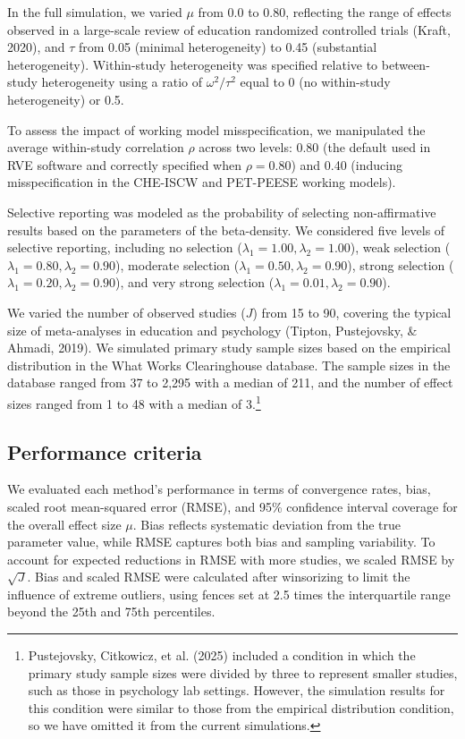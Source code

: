 \documentclass[
  man, donotrepeattitle,floatsintext]{apa7}
\begin{document}
In the full simulation, we varied \(\mu\) from 0.0 to 0.80, reflecting the range of effects observed in a large-scale review of education randomized controlled trials (Kraft, 2020), and \(\tau\) from 0.05 (minimal heterogeneity) to 0.45 (substantial heterogeneity). Within-study heterogeneity was specified relative to between-study heterogeneity using a ratio of \(\omega^2 / \tau^2\) equal to 0 (no within-study heterogeneity) or 0.5.

To assess the impact of working model misspecification, we manipulated the average within-study correlation \(\rho\) across two levels: 0.80 (the default used in RVE software and correctly specified when \(\rho = 0.80\)) and 0.40 (inducing misspecification in the CHE-ISCW and PET-PEESE working models).

Selective reporting was modeled as the probability of selecting non-affirmative results based on the parameters of the beta-density. We considered five levels of selective reporting, including no selection (\(\lambda_1 = 1.00, \lambda_2 = 1.00\)), weak selection (\(\lambda_1 = 0.80, \lambda_2 = 0.90\)), moderate selection (\(\lambda_1 = 0.50, \lambda_2 = 0.90\)), strong selection (\(\lambda_1 = 0.20, \lambda_2 = 0.90\)), and very strong selection (\(\lambda_1 = 0.01, \lambda_2 = 0.90\)).

We varied the number of observed studies (\(J\)) from 15 to 90, covering the typical size of meta-analyses in education and psychology (Tipton, Pustejovsky, \& Ahmadi, 2019).
We simulated primary study sample sizes based on the empirical distribution in the What Works Clearinghouse database. The sample sizes in the database ranged from 37 to 2,295 with a median of 211, and the number of effect sizes ranged from 1 to 48 with a median of 3.\footnote{
  Pustejovsky, Citkowicz, et al. (2025) included a condition in which the primary study sample sizes were divided by three to represent smaller studies, such as those in psychology lab settings. However, the simulation results for this condition were similar to those from the empirical distribution condition, so we have omitted it from the current simulations.}

\subsection{Performance criteria}\label{performance-criteria}

We evaluated each method's performance in terms of convergence rates, bias, scaled root mean-squared error (RMSE), and 95\% confidence interval coverage for the overall effect size \(\mu\).
Bias reflects systematic deviation from the true parameter value, while RMSE captures both bias and sampling variability.
To account for expected reductions in RMSE with more studies, we scaled RMSE by \(\sqrt{J}\).
Bias and scaled RMSE were calculated after winsorizing to limit the influence of extreme outliers, using fences set at 2.5 times the interquartile range beyond the 25th and 75th percentiles.
\end{document}
